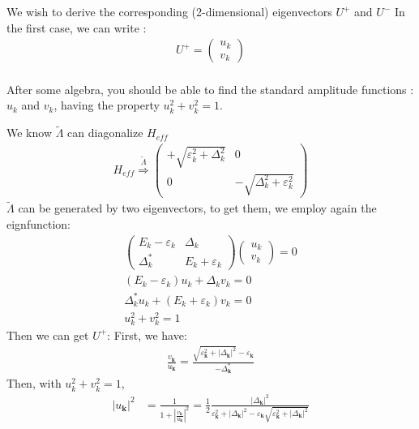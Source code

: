 \documentclass[answers]{exam}
\begin{document}
\begin{questions}
\newpage    
\question We wish to derive the corresponding (2-dimensional) eigenvectors $U^{+}$ and $U^{-}$
In the first case, we can write :
\begin{align*}
U^{+}=\left(\begin{array}{c}
u_{k} \\
v_{k}
\end{array}\right)    
\end{align*}\\
After some algebra, you should be able to find the standard amplitude functions : $u_{k}$ and $v_{k}$, having the property $u_{k}^{2}+v_{k}^{2}=1$.
\begin{solution}
We know $\tilde {\Lambda}$ can diagonalize $H_{eff}$\\
\begin{align*}
H_{e f f} \stackrel{\tilde {\Lambda} }{\Rightarrow }\left(\begin{array}{cc}
+\sqrt{\varepsilon_{k}^{2}+\Delta_{k}^{2}} & 0 \\ 0 & -\sqrt{\Delta_{k}^{2}+\varepsilon_{k}^{2}}
\end{array}\right)      
\end{align*}
$\tilde {\Lambda}$ can be generated by two eigenvectors, to get them, we employ again the eignfunction:
\begin{align*}
\left(\begin{array}{cc}
E_{k}-\varepsilon_{k} & \Delta_{ k} \\
\Delta^{*}_{k} & E_{k}+\varepsilon_{k}
\end{array}\right)\left(\begin{array}{c}
u_{k} \\v_{k}
\end{array}\right)=0 \\
\left(E_{k}-\varepsilon _{k}\right) u_{k}+\Delta_{k} v_{k}=0 \\
\Delta_{k}^{*} u_{k}+\left(E_{k}+\varepsilon _{k}\right) v_{k}=0 \\
u_{k}^{2}+v_{k}^{2}=1
\end{align*}
Then we can get $U^{+}$:
First, we have:
\begin{align*}
\frac{v_{\mathbf{k}}}{u_{\mathbf{k}}}=\frac{\sqrt{\varepsilon _{\mathbf{k}}^{2}+\left|\Delta_{\mathbf{k}}\right|^{2}}-\varepsilon_{\mathbf{k}}}{-\Delta_{\mathbf{k}}^{*}}  
\end{align*}
Then, with $u_{k}^{2}+v_{k}^{2}=1$,
\begin{align*}
\left|u_{\mathbf{k}}\right|^{2}&= \frac{1}{1+\left|\frac{v_{\mathbf{k}}}{u_{\mathbf{k}}}\right|^{2}}=\frac{1}{2} \frac{\left|\Delta_{\mathbf{k}}\right|^{2}}{\varepsilon _{\mathbf{k}}^{2}+\left|\Delta_{\mathbf{k}}\right|^{2}-\varepsilon _{\mathbf{k}} \sqrt{\varepsilon _{\mathbf{k}}^{2}+\left|\Delta_{\mathbf{k}}\right|^{2}}} \\

\end{align*}
\end{solution}
\end{questions}
\end{document}
